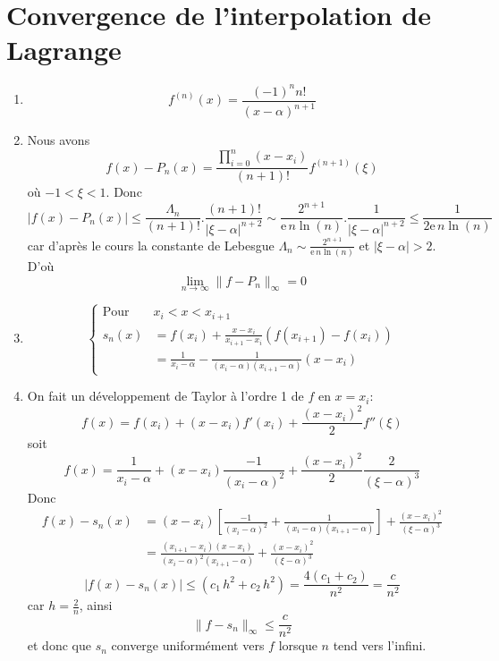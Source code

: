 \documentclass[a4paper]{article}
\begin{document}
\section{Convergence de l'interpolation de Lagrange} 
\begin{enumerate}
\item \[f^{(n)}(x)=\frac{(-1)^n n!}{(x-\alpha)^{n+1}}\]
\item Nous avons
\[f(x) - P_n(x) =\frac{\prod_{i=0}^n\left(x-x_i\right)}{(n + 1)!}f^{(n+1)}(\xi)\]
où  $-1 < \xi < 1$. Donc
\[|f(x)-P_n(x)|\leq \frac{\Lambda_n }{(n + 1)!}.\frac{ (n + 1)!}{|\xi-\alpha|^{n+2}}\sim \frac{2^{n+1}}{\mbox{e}\, n\ln(n)}.\frac{ 1}{|\xi-\alpha|^{n+2}}\leq \frac{1}{2\mbox{e}\, n\ln(n)}\]
car d'après le cours  la constante de Lebesgue $\Lambda_n \sim \frac{2^{n+1}}{\mbox{e}\, n\ln(n)} $ et $|\xi-\alpha|>2$.  
D'où
\[\lim_{n\to \infty}\|f-P_n\|_{\infty}=0\]
\item  \[\left\{\begin{array}{rl}
 \mbox{Pour } &x_i<x<x_{i+1}\\
s_n(x)&=f(x_i)+\frac{x-x_i}{x_{i+1}-x_{i}}\left(f(x_{i+1})-f(x_{i})\right)\\
 &=\frac{1}{x_i-\alpha}-\frac{1}{(x_i-\alpha)(x_{i+1}-\alpha)}(x-x_i)
\end{array}\right.
\]
\item On fait un développement de Taylor à l'ordre 1 de $f$ en $x=x_i$:
\[f(x)=f(x_i)+(x-x_i)f'(x_i)+\frac{(x-x_i)^2}{2}f''(\xi)\]
soit
\[f(x)=\frac{1}{x_i-\alpha}+(x-x_i)\frac{-1}{(x_i-\alpha)^2}+\frac{(x-x_i)^2}{2}\frac{2}{(\xi-\alpha)^{3}}\]
Donc
\[\begin{array}{ll}
f(x)-s_n(x)  &= (x-x_i)\left[\frac{-1}{(x_i-\alpha)^2}+\frac{1}{(x_i-\alpha)(x_{i+1}-\alpha)}\right]+\frac{(x-x_i)^2}{(\xi-\alpha)^{3}}\\
&= \frac{(x_{i+1}-x_i)(x-x_i)}{(x_i-\alpha)^2(x_{i+1}-\alpha)}+\frac{(x-x_i)^2}{(\xi-\alpha)^{3}}
\end{array}
\]
\[|f(x)-s_n(x)|\leq (c_1\,h^2+c_2\,h^2)=\frac{4(c_1+c_2)}{n^2}=\frac{c}{n^2}\]
car $h=\frac 2n$, ainsi
\[\|f-s_n\|_{ \infty}\leq \frac c{n^2}\]
et donc que $s_n$ converge uniformément vers $f$ lorsque $n$ tend vers l'infini.

\end{enumerate}
\end{document}
